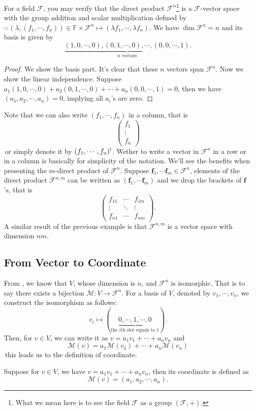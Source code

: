 \begin{example}
    For a field $\mathcal{F}$, you may verify that the direct product $\mathcal{F}^{n}$\footnote{What we mean here is to see the field $\mathcal{F}$ as a group $(\mathcal{F},+)$.} is a $\mathcal{F}$-vector space with the group addition and scalar multiplication defined by $\cdot:(\lambda, (f_1,\cdots,f_n))\in \mathbb{F}\times \mathcal{F}^n \mapsto (\lambda f_1,\cdots,\lambda f_n)$. We have $\dim \mathcal{F}^{n} = n$ and its basis is given by 
    $$\underbrace{(1,0,\cdots,0), (0,1,\cdots,0), \cdots, (0,0,\cdots,1)}_{n \text{ vectors}}.$$
\end{example}
\begin{proof}
    We show the basis part. It's clear that these $n$ vectors span $\mathcal{F}^{n}$. Now we show the linear independence. Suppose $a_1 (1,0,\cdots,0) + a_2 (0,1,\cdots,0) +\cdots + a_n (0,0,\cdots,1) = 0$, then we have $(a_1, a_2, \cdots, a_n) = 0$, implying all $a_i$'s are zero.
\end{proof}

Note that we can also write $(f_1, \cdots, f_n)$ in a column, that is 
$$\begin{pmatrix}
    f_1  \\ \vdots  \\ f_n 
\end{pmatrix}$$
\,or simply denote it by $(f_1,\cdots, f_n)^{\prime}$. Wether to write a vector in $\mathcal{F}^n$ in a row or in a column is basically for simplicity of the notation.
We'll see the benefits when presenting the $m$-direct product of $\mathcal{F}^n$. Suppose $\mathbf{f}_1,\cdots \mathbf{f}_m \in \mathcal{F}^n$, elements of the direct product $\mathcal{F}^{n,m}$
can be written as $(\mathbf{f}_1,\cdots \mathbf{f}_m)$ and we drop the brackets of $\mathbf{f}$'s, that is 
$$\begin{pmatrix}
f_{11}  &\cdots  & f_{1m}\\
\vdots  & \ddots & \vdots\\
f_{n1} &\cdots & f_{nm}
\end{pmatrix}.$$
A similar result of the previous example is that $\mathcal{F}^{n,m}$ is a vector space with dimension $nm$.

\subsection{From Vector to Coordinate}
From , we know that $V$, whose dimension is $n$, and $\mathcal{F}^{n}$ is isomorphic. That is to say there exists a bijection
$\mathcal{M}:V\to \mathcal{F}^{n}$. For a basis of $V$, denoted by $v_1,\cdots, v_n$, we construct the isomorphism as follows: 
$$v_i \mapsto (\underbrace{0,\cdots, 1,\cdots, 0}_{\text{the } i\text{th slot equals to 1}}).$$
Then, for $v \in V$, we can write it as $v = a_1 v_1 +\cdots +a_n v_n$ and $$\mathcal{M}(v) = a_1 \mathcal{M}(v_1) +\cdots +a_n \mathcal{M}(v_n)$$
\,this leads us to the definition of coordinate.
\begin{definition}[Coordinate]
    Suppose for $v \in V$, we have $v = a_1 v_1 +\cdots +a_n v_n$, then its coordinate is defined as 
    $$\mathcal{M}(v) = (a_1, a_2,\cdots, a_n).$$
\end{definition}

